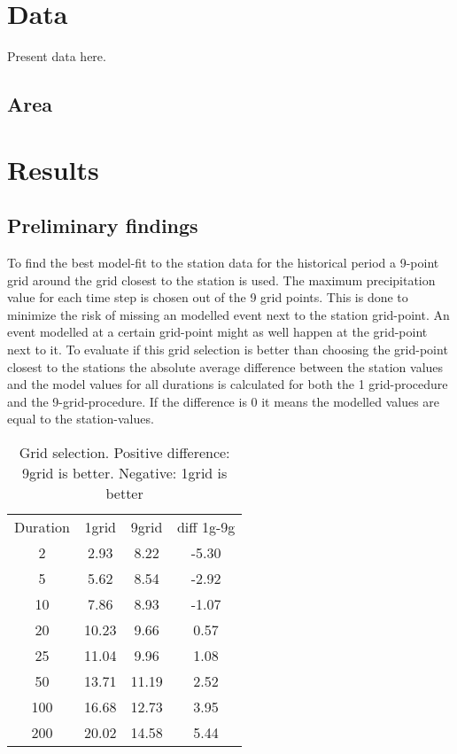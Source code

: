 \documentclass[12pt]{article}
\begin{document}
{\section{Data}
Present data here.



\subsection{Area}





\section{Results}

\subsection{Preliminary findings}

To find the best model-fit to the station data for the historical period a 9-point grid around the grid closest to the station is used. The maximum precipitation value for each time step is chosen out of the 9 grid points. This is done to minimize the risk of missing an modelled event next to the station grid-point. An event modelled at a certain grid-point might as well happen at the grid-point next to it. To evaluate if this grid selection is better than choosing the grid-point closest to the stations the absolute average difference between the station values and the model values for all durations is calculated for both the 1 grid-procedure and the 9-grid-procedure. If the difference is 0 it means the modelled values are equal to the station-values.  

\begin{table}
\begin{tabular}{ c c c c }
Duration & 1grid & 9grid & diff 1g-9g \\
2 & 2.93 & 8.22 & -5.30 \\
5 & 5.62 & 8.54 & -2.92 \\
10 & 7.86 & 8.93 & -1.07 \\
20 & 10.23 & 9.66 & 0.57 \\
25 & 11.04 & 9.96 & 1.08 \\
50 & 13.71 & 11.19 & 2.52 \\
100 & 16.68 & 12.73 & 3.95 \\
200 & 20.02 & 14.58 & 5.44
\end{tabular}
\caption{Grid selection. Positive difference: 9grid is better. Negative: 1grid is better}
\label{grid}
\end{table}

}
\end{document}
